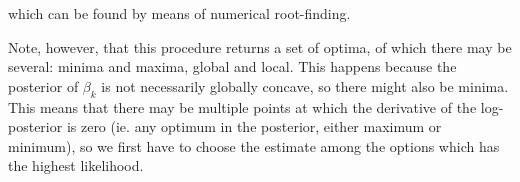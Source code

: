 \documentclass{article}\usepackage[]{graphicx}\usepackage[]{color}
\begin{document}
which can be found by means of numerical root-finding.

Note, however, that this procedure returns a set of optima, of which there may be several: minima and maxima, global and local. This happens because the posterior of $\beta_k$ is not necessarily globally concave, so there might also be minima. This means that there may be multiple points at which the derivative of the log-posterior is zero (ie. any optimum in the posterior, either maximum or minimum), so we first have to choose the estimate among the options which has the highest likelihood.




% 
\end{document}
